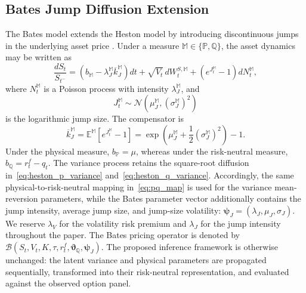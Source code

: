 \documentclass[sigconf,anonymous,review]{acmart}
\begin{document}
\subsection{Bates Jump Diffusion Extension}
\label{sec:bates}

The Bates model extends the Heston model by introducing discontinuous jumps in the underlying asset price \cite{bates1996}. Under a measure \(\mathbb{M}\in\{\mathbb{P},\mathbb{Q}\}\), the asset dynamics may be written as
%
\begin{equation}
\frac{dS_t}{S_{t^-}}
=
\left(
b_{\mathbb{M}}
-
\lambda_J^{\mathbb{M}}
\overline{k}_J^{\mathbb{M}}
\right)dt
+
\sqrt{V_t}\,dW_t^{S,\mathbb{M}}
+
\left(
e^{J_t^{\mathbb{M}}}-1
\right)dN_t^{\mathbb{M}},
\label{eq:bates_asset}
\end{equation}
%
where \(N_t^{\mathbb{M}}\) is a Poisson process with intensity \(\lambda_J^{\mathbb{M}}\), and
%
\begin{equation}
J_t^{\mathbb{M}}
\sim
\mathcal{N}
\left(
\mu_J^{\mathbb{M}},
\left(\sigma_J^{\mathbb{M}}\right)^2
\right)
\end{equation}
%
is the logarithmic jump size. The compensator is
%
\begin{equation}
\overline{k}_J^{\mathbb{M}}
=
\mathbb{E}^{\mathbb{M}}
\left[
e^{J_t^{\mathbb{M}}}-1
\right]
=
\exp
\left(
\mu_J^{\mathbb{M}}
+
\frac{1}{2}
\left(\sigma_J^{\mathbb{M}}\right)^2
\right)
-1.
\end{equation}
%
Under the physical measure, \(b_{\mathbb{P}}=\mu\), whereas under the risk-neutral measure,
$
b_{\mathbb{Q}} = r_t^{f} - q_{t}.$
The variance process retains the square-root diffusion in~\eqref{eq:heston_p_variance} and~\eqref{eq:heston_q_variance}. Accordingly, the same physical-to-risk-neutral mapping in~\eqref{eq:pq_map} is used for the variance mean-reversion parameters, while the Bates parameter vector additionally contains the jump intensity, average jump size, and jump-size volatility:
$ \boldsymbol{\psi}_J =
\left(
\lambda_J,
\mu_J,
\sigma_J
\right).
$
We reserve \(\lambda_V\) for the volatility risk premium and \(\lambda_J\) for the jump intensity throughout the paper.
The Bates pricing operator is denoted by
$
\mathcal{B}
\left(
S_t,
V_t,
K,
\tau,
r_t^{f},
\boldsymbol{\vartheta}_{\mathbb{Q}},
\boldsymbol{\psi}_J
\right).
$
The proposed inference framework is otherwise unchanged: the latent variance and physical parameters are propagated sequentially, transformed into their risk-neutral representation, and evaluated against the observed option panel.
\end{document}
